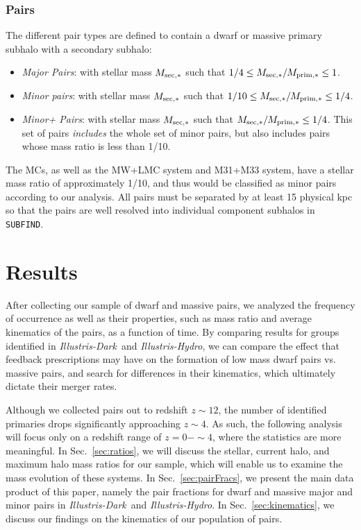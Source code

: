 \documentclass[twocolumn]{aastex63}
\newcommand\ID{\textit{Illustris-Dark}}
\newcommand\IH{\textit{Illustris-Hydro}}
\newcommand\SUBFIND{\texttt{SUBFIND}}
\begin{document}
\subsubsection{Pairs}
The different pair types are defined to contain a dwarf or massive primary subhalo with a secondary subhalo:
\begin{itemize}
    \item \textit{Major Pairs}: with stellar mass $M_{\rm sec,*}$ such that $1/4 \leq M_{\rm sec,*}/M_{\rm prim,*} \leq 1$.
    \item \textit{Minor pairs}: with stellar mass $M_{\rm sec,*}$ such that $1/10 \leq M_{\rm sec,*}/M_{\rm prim,*} \leq 1/4$.
    \item \textit{Minor+ Pairs}: with stellar mass $M_{\rm sec,*}$ such that $M_{\rm sec,*}/M_{\rm prim,*} \leq 1/4$. This set of pairs \textit{includes} the whole set of minor pairs, but also includes pairs whose mass ratio is less than 1/10. 
\end{itemize}
The MCs, as well as the MW+LMC system and M31+M33 system, have a stellar mass ratio of approximately 1/10, and thus would be classified as minor pairs according to our analysis. All pairs must be separated by at least 15 physical kpc so that the pairs are well resolved into individual component subhalos in \SUBFIND.




%
%




\section{Results}\label{sec:results}
After collecting our sample of dwarf and massive pairs, we analyzed the frequency of occurrence as well as their properties, such as mass ratio and average kinematics of the pairs, as a function of time. By comparing results for groups identified in \ID\ and \IH , we can compare the effect that feedback prescriptions may have on the formation of low mass dwarf pairs vs. massive pairs, and search for differences in their kinematics, which ultimately dictate their merger rates.

Although we collected pairs out to redshift $z\sim12$, the number of identified primaries drops significantly approaching $z\sim4$. As such, the following analysis will focus only on a redshift range of $z=0-\sim4$, where the statistics are more meaningful. In Sec.~\ref{sec:ratios}, we will discuss the stellar, current halo, and maximum halo mass ratios for our sample, which will enable us to examine the mass evolution of these systems. In Sec.~\ref{sec:pairFracs}, we present the main data product of this paper, namely the pair fractions for dwarf and massive major and minor pairs in \ID\ and \IH. In Sec.~\ref{sec:kinematics}, we discuss our findings on the kinematics of our population of pairs.
\end{document}
